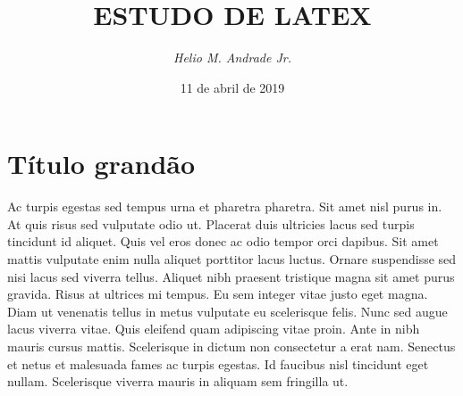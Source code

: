 \documentclass[12pt]{article}
\begin{document}
	\SetWatermarkText{}
	\title{ \textbf{ESTUDO DE LATEX} } %
	\author{ \textit{Helio M. Andrade Jr.} } %
	\date{11 de abril de 2019} %
	\maketitle %
	\thispagestyle{empty} %
	\newpage
	
	
	
	\setcounter{page}{1} %
	
	\tableofcontents %
	\newpage
	
	\listoffigures %
	\newpage
	
	\listoftables %
	\newpage
	
	\setcounter{page}{1}  %
	
	
	
	\section{Título grand\~ao}
		Ac turpis egestas sed tempus urna et pharetra pharetra. Sit amet nisl purus in. At quis risus sed vulputate odio ut. Placerat duis ultricies lacus sed turpis tincidunt id aliquet. Quis vel eros donec ac odio tempor orci dapibus. Sit amet mattis vulputate enim nulla aliquet porttitor lacus luctus. Ornare suspendisse sed nisi lacus sed viverra tellus. Aliquet nibh praesent tristique magna sit amet purus gravida. Risus at ultrices mi tempus. Eu sem integer vitae justo eget magna. Diam ut venenatis tellus in metus vulputate eu scelerisque felis. Nunc sed augue lacus viverra vitae. Quis eleifend quam adipiscing vitae proin. Ante in nibh mauris cursus mattis. Scelerisque in dictum non consectetur a erat nam. Senectus et netus et malesuada fames ac turpis egestas. Id faucibus nisl tincidunt eget nullam. Scelerisque viverra mauris in aliquam sem fringilla ut.
\end{document}
